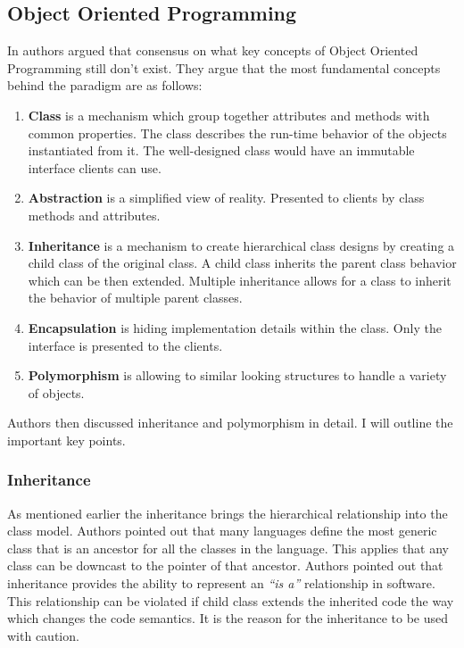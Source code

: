 \documentclass[12pt,twoside,a4paper]{report}
\begin{document}
\subsection{Object Oriented Programming}
In \cite{13} authors argued that consensus on what key concepts of Object Oriented Programming still don't exist. They argue that the most fundamental concepts behind the paradigm are as follows:

\begin{enumerate}
\item \textbf{Class} is a mechanism which group together attributes and methods with common properties. The class describes the run-time behavior of the objects instantiated from it. The well-designed class would have an immutable interface clients can use.
\item \textbf{Abstraction} is a simplified view of reality. Presented to clients by class methods and attributes.
\item \textbf{Inheritance} is a mechanism to create hierarchical class designs by creating a child class of the original class. A child class inherits the parent class behavior which can be then extended. Multiple inheritance allows for a class to inherit the behavior of multiple parent classes.
\item \textbf{Encapsulation} is hiding implementation details within the class. Only the interface is presented to the
clients.
\item \textbf{Polymorphism} is allowing to similar looking structures to handle a variety of objects.
\end{enumerate}

Authors then discussed inheritance and polymorphism in detail. I will outline the important key points.

\subsubsection{Inheritance}
As mentioned earlier the inheritance brings the hierarchical relationship into the class model. Authors pointed out that many languages define the most generic class that is an ancestor for all the classes in the language. This applies that any class can be downcast to the pointer of that ancestor. Authors pointed out
that inheritance provides the ability to represent an \textit{“is a”} relationship in software. This relationship can be violated if child class extends the inherited code the way which changes the code semantics. It is the reason for the inheritance to be used with caution. 
\end{document}
